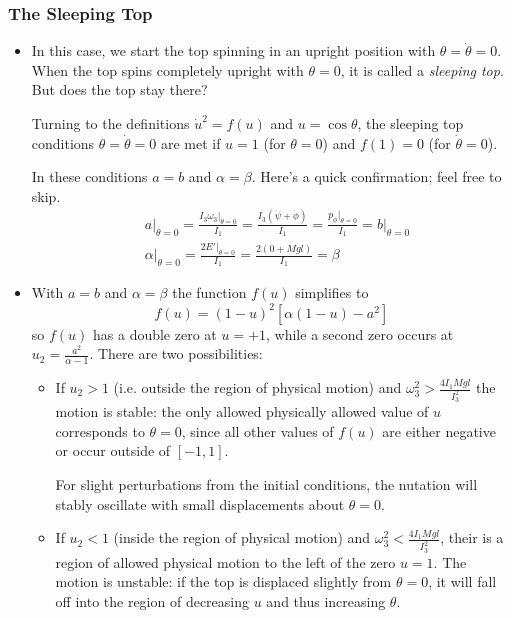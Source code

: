 \documentclass[11pt, a4paper]{article}
\begin{document}
\subsubsection{The Sleeping Top}

\begin{itemize}
	\item In this case, we start the top spinning in an upright position with $ \theta = \dot{\theta} = 0 $. When the top spins completely upright with $ \theta = 0 $, it is called a \textit{sleeping top}. But does the top stay there?
	
	Turning to the definitions $ \dot{u}^{2} = f(u) $ and $ u = \cos \theta $, the sleeping top conditions $ \theta = \dot{\theta} = 0 $ are met if $ u = 1 $ (for $ \theta = 0 $) and $ f(1) = 0 $ (for $ \dot{\theta} = 0 $).
	
	In these conditions $ a = b $ and $ \alpha = \beta $. Here's a quick confirmation; feel free to skip.
	\begin{align*}
		&a \big|_{\theta = 0} = \frac{I_{3}\omega_{3}\big|_{\theta = 0}}{I_{1}} = \frac{I_{3}(\dot{\psi} + \dot{\phi})}{I_{1}} = \frac{p_{\phi}\big|_{\theta = 0}}{I_{1}} = b \big|_{\theta = 0} \\
		&\alpha\big|_{\theta = 0} = \frac{2E' \big|_{\theta=0}}{I_{1}} = \frac{2(0 + Mgl)}{I_{1}} = \beta
	\end{align*}
	
	\item With $ a = b $ and $ \alpha = \beta $ the function $ f(u) $ simplifies to
	\begin{equation*}
		f(u) = (1-u)^{2}\left[\alpha(1-u)-a^{2}\right]
	\end{equation*}
	so $ f(u) $ has a double zero at $ u = + 1 $, while a second zero occurs at $ u_{2} = \frac{a^{2}}{\alpha - 1} $. There are two possibilities:
	\begin{itemize}
		\item If $ u_{2} > 1 $ (i.e. outside the region of physical motion) and $ \omega_{3}^{2} > \frac{4I_{1}Mgl}{I_{3}^{2}} $ the motion is stable: the only allowed physically allowed value of $ u $ corresponds to $ \theta = 0 $, since all other values of $ f(u) $ are either negative or occur outside of $ [-1, 1] $.
		
		For slight perturbations from the initial conditions, the nutation will stably oscillate with small displacements about $ \theta = 0 $. 
		
		\item If $ u_{2} < 1 $ (inside the region of physical motion) and $ \omega_{3}^{2} < \frac{4I_{1}Mgl}{I_{3}^{2}} $, their is a region of allowed physical motion to the left of the zero $ u = 1 $. The motion is unstable: if the top is displaced slightly from $ \theta = 0 $, it will fall off into the region of decreasing $ u $ and thus increasing $ \theta $.
		

\end{itemize}
\end{itemize}
\end{document}
